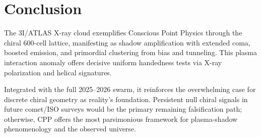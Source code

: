 \documentclass[11pt]{article}
\begin{document}
\section{Conclusion}
The 3I/ATLAS X-ray cloud exemplifies Conscious Point Physics through the chiral 600-cell lattice, manifesting as shadow amplification with extended coma, boosted emission, and primordial clustering from bias and tunneling. This plasma interaction anomaly offers decisive uniform handedness tests via X-ray polarization and helical signatures.  

Integrated with the full 2025--2026 swarm, it reinforces the overwhelming case for discrete chiral geometry as reality's foundation. Persistent null chiral signals in future comet/ISO surveys would be the primary remaining falsification path; otherwise, CPP offers the most parsimonious framework for plasma-shadow phenomenology and the observed universe.
\end{document}
